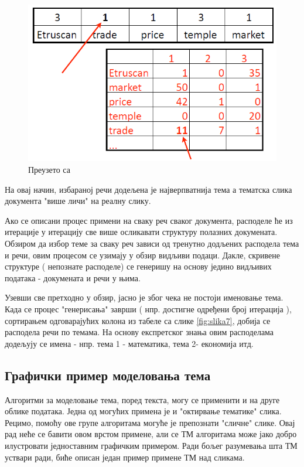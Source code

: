 \begin{figure}[H]
    \centering
   \includegraphics[scale=0.6]{./Slike/slika11.png} 
	\caption{Преузето са \cite{mimno1}}
	\label{fig:slika11}
\end{figure}


На овај начин, избараној речи додељена је најверпватнија тема а тематска слика документа "више личи" на реалну слику. 

Ако се описани процес примени на сваку реч сваког документа, расподеле ће из итерације у итерацију све више осликавати структуру полазних докумената. Обзиром да избор теме за сваку реч зависи од тренутно додљених расподела тема и речи, овим процесом се узимају у обзир видљиви подаци. Дакле, скривене структуре ( непознате расподеле) се генеришу на основу једино видљивих података - докумената и речи у њима.

Узевши све претходно у обзир, јасно је због чека не постоји именовање тема. Када се процес "генерисања"   заврши ( нпр. достигне  одређени број итерација ), сортирањем одговарајућих колона из табеле са слике \ref{fig:slika7}, добија се  расподела речи по темама. На основу експретског знања овим расподелама додељују се имена - нпр. тема 1 - математика, тема 2- економија итд.

\subsection{Графички пример моделовања тема}

Алгоритми за моделовање тема, поред текста, могу се применити и на друге облике података. Једна од могућих примена је и "октирвање тематике" слика. Рецимо, помоћу ове групе алгоритама могуће је препознати "сличне" слике. Овај рад неће се бавити овом врстом примене, али се  ТМ алгоритама може јако добро илустровати једноставним графичким примером. Ради бољег разумевања шта ТМ уствари ради, биће описан један  пример примене ТМ над сликама.




























